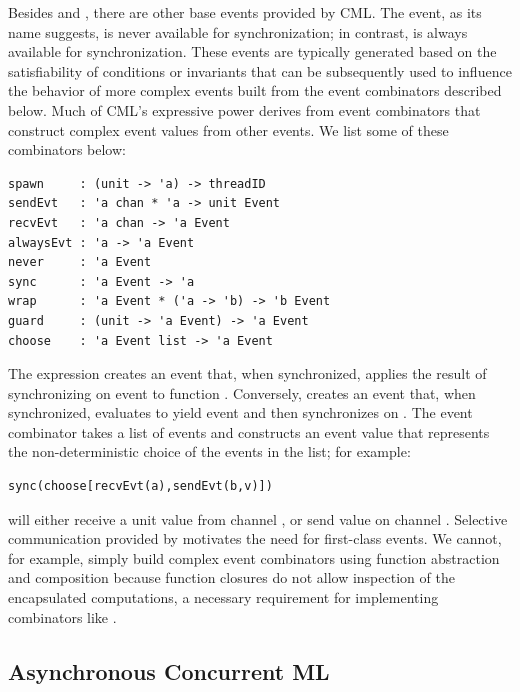 Besides  and , there are other base events provided by
CML\@.  The  event, as its name suggests, is never available for
synchronization; in contrast,  is always available for
synchronization.  These events are typically generated based on the
satisfiability of conditions or invariants that can be subsequently used to
influence the behavior of more complex events built from the event combinators
described below.  Much of CML's expressive power derives from event combinators
that construct complex event values from other events.  We list some of these
combinators below:
\vspace{5mm}

\lstset{numbers=none}
\begin{lstlisting}
spawn     : (unit -> 'a) -> threadID
sendEvt   : 'a chan * 'a -> unit Event
recvEvt   : 'a chan -> 'a Event
alwaysEvt : 'a -> 'a Event
never     : 'a Event
sync      : 'a Event -> 'a
wrap      : 'a Event * ('a -> 'b) -> 'b Event
guard     : (unit -> 'a Event) -> 'a Event
choose    : 'a Event list -> 'a Event
\end{lstlisting}

The expression  creates an event that, when synchronized,
applies the result of synchronizing on event  to function .
Conversely,  creates an event that, when synchronized, evaluates
 to yield event  and then synchronizes on .  The
 event combinator takes a list of events and constructs an event
value that represents the non-deterministic choice of the events in the list;
for example:
\vspace{5mm}

\lstset{numbers=none}
\begin{lstlisting}
sync(choose[recvEvt(a),sendEvt(b,v)])
\end{lstlisting}

\noindent will either receive a unit value from channel , or send value
 on channel .  Selective communication provided by 
motivates the need for first-class events. We cannot, for example, simply build
complex event combinators using function abstraction and composition because
function closures do not allow inspection of the encapsulated computations, a
necessary requirement for implementing combinators like .

\subsection{Asynchronous Concurrent ML}

